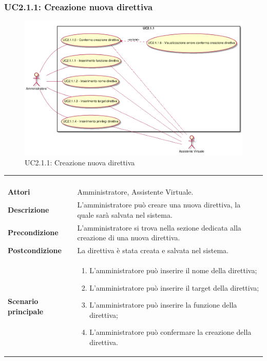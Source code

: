 \newpage\subsubsection{UC2.1.1: Creazione nuova direttiva}
\label{UC2.1.1}
\begin{figure}[h]
	\centering
	\includegraphics[width=\textwidth,height=\textheight,keepaspectratio]{images/UseCaseUC211.png}
	\caption{UC2.1.1: Creazione nuova direttiva}
\end{figure}
\begin{longtable}{l|p{10cm}}
	\rowcolor[gray]{0.8} \multicolumn{2}{c}{} \\
	\rowcolor[gray]{0.8} \multicolumn{2}{c}{\textbf{UC2.1.1 - Creazione nuova direttiva}} \\
	\rowcolor[gray]{0.8} \multicolumn{2}{c}{} \\
	\hline
	&\\
	\textbf{Attori} & Amministratore, Assistente Virtuale.\\[7pt]
	\textbf{Descrizione} & L'amministratore può creare una nuova direttiva, la quale sarà salvata nel sistema.\\[7pt]
	\textbf{Precondizione} & L'amministratore si trova nella sezione dedicata alla creazione di una nuova direttiva.\\[7pt]
	\textbf{Postcondizione} & La direttiva è stata creata e salvata nel sistema.\\[7pt]
	\textbf{Scenario principale} &\begin{enumerate}
		\item  L'amministratore può inserire il nome della direttiva;
		\item  L'amministratore può inserire il target della direttiva;
		\item  L'amministratore può inserire la funzione della direttiva;
		\item  L'amministratore può confermare la creazione della direttiva. 
	\end{enumerate}
	\\[7pt]\hline
\end{longtable}

